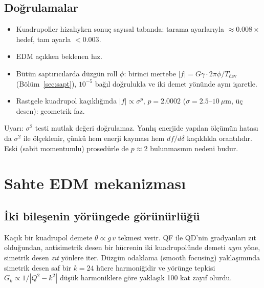 \documentclass[12pt,a4paper]{extarticle}
\begin{document}
\subsection{Doğrulamalar}\label{sec:benchmark}
\begin{itemize}[nosep]
\item Kuadrupoller hizalıyken sonuç sayısal tabanda: tarama ayarlarıyla $\approx0.008\times$hedef, tam ayarla
$<0.003$.
\item EDM açıkken beklenen hız.
\item Bütün saptırıcılarda düzgün roll $\phi$: birinci mertebe $|f|=G\gamma\cdot2\pi\phi/T_\text{dev}$
(Bölüm~\ref{sec:sapt}), $10^{-5}$ bağıl doğrulukla ve iki demet yönünde aynı işaretle.
\item Rastgele kuadrupol kaçıklığında $|f|\propto\sigma^p$, $p=2.0002$ ($\sigma=2.5$--$10~\mu$m, üç desen):
geometrik faz.
\end{itemize}
Uyarı: $\sigma^2$ testi mutlak değeri doğrulamaz. Yanlış enerjide yapılan ölçümün hatası da $\sigma^2$ ile
ölçeklenir, çünkü hem enerji kayması hem $df/d\delta$ kaçıklıkla orantılıdır. Eski (sabit momentumlu)
prosedürle de $p\approx2$ bulunmasının nedeni budur.

\section{Sahte EDM mekanizması}\label{sec:mekanizma}
\subsection{İki bileşenin yörüngede görünürlüğü}
Kaçık bir kuadrupol demete $\theta\propto g\,v$ tekmesi verir. QF ile QD'nin gradyanları zıt olduğundan,
antisimetrik desen bir hücrenin iki kuadrupolünde demeti \emph{aynı} yöne, simetrik desen \emph{zıt} yönlere
iter. Düzgün odaklama (smooth focusing) yaklaşımında simetrik desen saf bir $k=24$ hücre harmoniğidir ve
yörünge tepkisi $G_k\propto1/|Q^2-k^2|$ düşük harmoniklere göre yaklaşık 100 kat zayıf olurdu.
\end{document}
